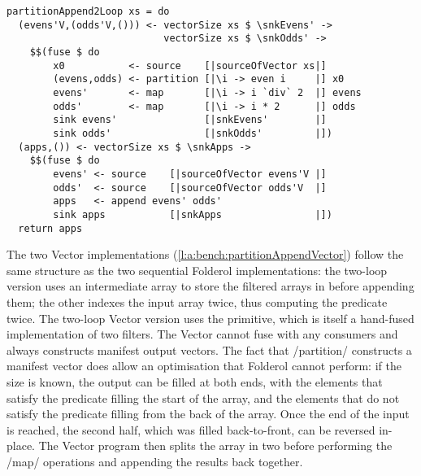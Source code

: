 \begin{lstlisting}[float,label=l:bench:partitionAppend2Loop,caption=Partition / append with two loops]
partitionAppend2Loop xs = do
  (evens'V,(odds'V,())) <- vectorSize xs $ \snkEvens' ->
                           vectorSize xs $ \snkOdds' ->
    $$(fuse $ do
        x0           <- source    [|sourceOfVector xs|]
        (evens,odds) <- partition [|\i -> even i     |] x0
        evens'       <- map       [|\i -> i `div` 2  |] evens
        odds'        <- map       [|\i -> i * 2      |] odds
        sink evens'               [|snkEvens'        |]
        sink odds'                [|snkOdds'         |])
  (apps,()) <- vectorSize xs $ \snkApps ->
    $$(fuse $ do
        evens' <- source    [|sourceOfVector evens'V |]
        odds'  <- source    [|sourceOfVector odds'V  |]
        apps   <- append evens' odds'
        sink apps           [|snkApps                |])
  return apps
\end{lstlisting}

The two Vector implementations (\cref{l:a:bench:partitionAppendVector}) follow the same structure as the two sequential Folderol implementations: the two-loop version uses an intermediate array to store the filtered arrays in before appending them; the other indexes the input array twice, thus computing the predicate twice.
The two-loop Vector version uses the \Hs@partition@ primitive, which is itself a hand-fused implementation of two filters.
The Vector \Hs@partition@ cannot fuse with any consumers and always constructs manifest output vectors.
The fact that \Hs/partition/ constructs a manifest vector does allow an optimisation that Folderol cannot perform: if the size is known, the output can be filled at both ends, with the elements that satisfy the predicate filling the start of the array, and the elements that do not satisfy the predicate filling from the back of the array.
Once the end of the input is reached, the second half, which was filled back-to-front, can be reversed in-place.
The Vector program then splits the array in two before performing the \Hs/map/ operations and appending the results back together.

